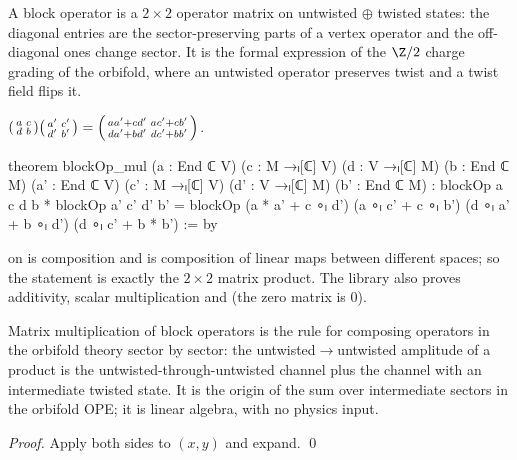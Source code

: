\begin{physics}
A block operator is a $2\times2$ operator matrix on untwisted $\oplus$ twisted states: the diagonal entries are the sector-preserving parts of a vertex operator and the off-diagonal ones change sector. It is the formal expression of the $\Z/2$ charge grading of the orbifold, where an untwisted operator preserves twist and a twist field flips it.
\end{physics}

\begin{proposition}\label{ch10:prop:blockmul}
$\begin{psmallmatrix}a&c\\d&b\end{psmallmatrix}\begin{psmallmatrix}a'&c'\\d'&b'\end{psmallmatrix}
=\begin{psmallmatrix}aa'+cd'&ac'+cb'\\da'+bd'&dc'+bb'\end{psmallmatrix}$.
\end{proposition}
\begin{leancode}
theorem blockOp_mul (a : End ℂ V) (c : M →ₗ[ℂ] V) (d : V →ₗ[ℂ] M) (b : End ℂ M)
    (a' : End ℂ V) (c' : M →ₗ[ℂ] V) (d' : V →ₗ[ℂ] M) (b' : End ℂ M) :
    blockOp a c d b * blockOp a' c' d' b'
      = blockOp (a * a' + c ∘ₗ d') (a ∘ₗ c' + c ∘ₗ b') (d ∘ₗ a' + b ∘ₗ d')
          (d ∘ₗ c' + b * b') := by
\end{leancode}
\begin{dictionary}
\lean{*} on  is composition and  is composition of linear maps between
different spaces; so the statement is exactly the $2\times2$ matrix product.  The library also
proves additivity, scalar multiplication and  (the zero matrix is $0$).
\end{dictionary}

\begin{physics}
Matrix multiplication of block operators is the rule for composing operators in the orbifold theory sector by sector: the untwisted$\to$untwisted amplitude of a product is the untwisted-through-untwisted channel plus the channel with an intermediate twisted state. It is the origin of the sum over intermediate sectors in the orbifold OPE; it is linear algebra, with no physics input.
\end{physics}

\emph{Proof.} Apply both sides to $(x,y)$ and expand. \qed

